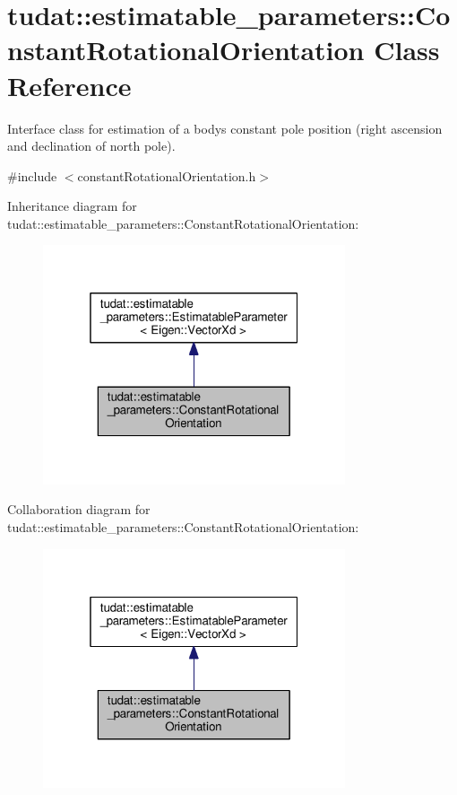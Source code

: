 \hypertarget{classtudat_1_1estimatable__parameters_1_1ConstantRotationalOrientation}{}\section{tudat\+:\+:estimatable\+\_\+parameters\+:\+:Constant\+Rotational\+Orientation Class Reference}
\label{classtudat_1_1estimatable__parameters_1_1ConstantRotationalOrientation}


Interface class for estimation of a body\textquotesingle{}s constant pole position (right ascension and declination of north pole).  




{\ttfamily \#include $<$constant\+Rotational\+Orientation.\+h$>$}



Inheritance diagram for tudat\+:\+:estimatable\+\_\+parameters\+:\+:Constant\+Rotational\+Orientation\+:
\nopagebreak
\begin{figure}[H]
\begin{center}
\leavevmode
\includegraphics[width=253pt]{classtudat_1_1estimatable__parameters_1_1ConstantRotationalOrientation__inherit__graph}
\end{center}
\end{figure}


Collaboration diagram for tudat\+:\+:estimatable\+\_\+parameters\+:\+:Constant\+Rotational\+Orientation\+:
\nopagebreak
\begin{figure}[H]
\begin{center}
\leavevmode
\includegraphics[width=253pt]{classtudat_1_1estimatable__parameters_1_1ConstantRotationalOrientation__coll__graph}
\end{center}
\end{figure}
